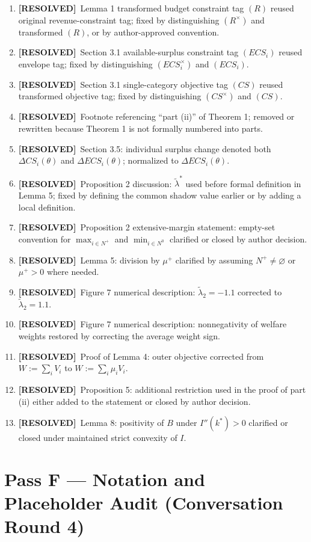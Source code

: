 \documentclass{class}
\newcommand{\ok}{\textcolor{ok}{\textbf{[RESOLVED]}}}
\begin{document}
\begin{enumerate}[leftmargin=1.5cm]
\item \ok\ Lemma 1 transformed budget constraint tag \((R)\) reused original revenue-constraint tag; fixed by distinguishing \((R^\times)\) and transformed \((R)\), or by author-approved convention.
\item \ok\ Section 3.1 available-surplus constraint tag \((ECS_i)\) reused envelope tag; fixed by distinguishing \((ECS_i^\times)\) and \((ECS_i)\).
\item \ok\ Section 3.1 single-category objective tag \((CS)\) reused transformed objective tag; fixed by distinguishing \((CS^\times)\) and \((CS)\).
\item \ok\ Footnote referencing ``part (ii)'' of Theorem 1; removed or rewritten because Theorem 1 is not formally numbered into parts.
\item \ok\ Section 3.5: individual surplus change denoted both \(\Delta CS_i(\theta)\) and \(\Delta ECS_i(\theta)\); normalized to \(\Delta ECS_i(\theta)\).
\item \ok\ Proposition 2 discussion: \(\tilde\lambda^\ast\) used before formal definition in Lemma 5; fixed by defining the common shadow value earlier or by adding a local definition.
\item \ok\ Proposition 2 extensive-margin statement: empty-set convention for \(\max_{i\in N^+}\) and \(\min_{i\in N^0}\) clarified or closed by author decision.
\item \ok\ Lemma 5: division by \(\mu^+\) clarified by assuming \(N^+\neq\varnothing\) or \(\mu^+>0\) where needed.
\item \ok\ Figure 7 numerical description: \(\tilde\lambda_2=-1.1\) corrected to \(\tilde\lambda_2=1.1\).
\item \ok\ Figure 7 numerical description: nonnegativity of welfare weights restored by correcting the average weight sign.
\item \ok\ Proof of Lemma 4: outer objective corrected from \(W:=\sum_i V_i\) to \(W:=\sum_i\mu_i V_i\).
\item \ok\ Proposition 5: additional restriction used in the proof of part (ii) either added to the statement or closed by author decision.
\item \ok\ Lemma 8: positivity of \(B\) under \(I''(k^\ast)>0\) clarified or closed under maintained strict convexity of \(I\).
\end{enumerate}

\section*{Pass F --- Notation and Placeholder Audit (Conversation Round 4)}
\end{document}
